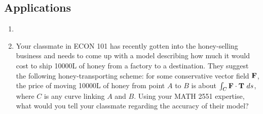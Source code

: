 \subsection*{Applications}
\begin{enumerate}[resume]
    \item {}
        {%
        
        }
    \item Your classmate in ECON 101 has recently gotten into the honey-selling business and needs to come up with a model describing how much it would cost to ship 10000L of honey from a factory to a destination. They suggest the following honey-transporting scheme: for some conservative vector field $\mathbf{F}$, the price of moving 10000L of honey from point $A$ to $B$ is about $\int_C \mathbf{F}\cdot \mathbf{T} \ ds$, where $C$ is any curve linking $A$ and $B$. Using your MATH 2551 expertise, what would you tell your classmate regarding the accuracy of their model? 
\end{enumerate}

